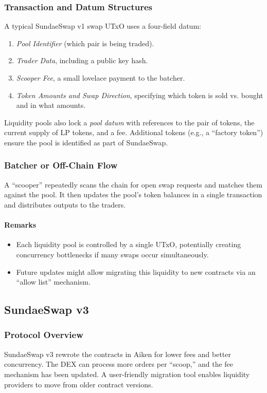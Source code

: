 \documentclass{article}
\begin{document}
\subsubsection{Transaction and Datum Structures}
A typical SundaeSwap v1 swap UTxO uses a four-field datum:
\begin{enumerate}
    \item \emph{Pool Identifier} (which pair is being traded).
    \item \emph{Trader Data}, including a public key hash.
    \item \emph{Scooper Fee}, a small lovelace payment to the batcher.
    \item \emph{Token Amounts and Swap Direction}, specifying which token is sold vs. bought and in what amounts.
\end{enumerate}

Liquidity pools also lock a \emph{pool datum} with references to the pair of tokens, the current supply of LP tokens, and a fee. Additional tokens (e.g., a ``factory token'') ensure the pool is identified as part of SundaeSwap. 

\subsubsection{Batcher or Off-Chain Flow}
A ``scooper'' repeatedly scans the chain for open swap requests and matches them against the pool. It then updates the pool’s token balances in a single transaction and distributes outputs to the traders.

\paragraph{Remarks}
\begin{itemize}
    \item Each liquidity pool is controlled by a single UTxO, potentially creating concurrency bottlenecks if many swaps occur simultaneously.
    \item Future updates might allow migrating this liquidity to new contracts via an ``allow list'' mechanism.
\end{itemize}



\subsection{SundaeSwap v3}
\label{sec:sundae_v3}

\subsubsection{Protocol Overview}
SundaeSwap v3 rewrote the contracts in Aiken for lower fees and better concurrency. The DEX can process more orders per ``scoop,'' and the fee mechanism has been updated. A user-friendly migration tool enables liquidity providers to move from older contract versions.
\end{document}
